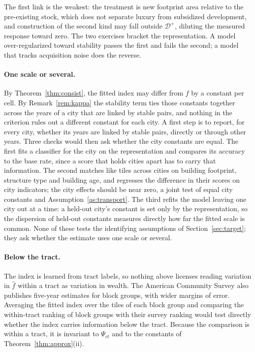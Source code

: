 \documentclass[11pt]{article}
\theoremstyle{remark}
\begin{document}
The first link is the weakest: the treatment is new footprint area relative to the pre-existing stock,
which does not separate luxury from subsidized development, and construction of the second kind may fall
outside $\mathcal{D}^{+}$, diluting the measured response toward zero. The two exercises bracket the
representation. A model over-regularized toward stability passes the first and fails the second; a model
that tracks acquisition noise does the reverse.

\paragraph{One scale or several.} By Theorem~\ref{thm:consist}, the fitted index may differ from $f$
by a constant per cell. By Remark~\ref{rem:kappa} the stability term ties those constants together
across the years of a city that are linked by stable pairs, and nothing in the criterion rules out a
different constant for each city. A first step is to report, for every city, whether its years are
linked by stable pairs, directly or through other years. Three checks would then ask whether the city
constants are equal. The first fits a classifier for the city on the representation and compares its accuracy to the base rate, since
a score that holds cities apart has to carry that information. The second matches like tiles across
cities on building footprint, structure type and building age, and regresses the difference in their
scores on city indicators; the city effects should be near zero, a joint test of equal city constants and
Assumption~\ref{as:transport}. The third refits the model leaving one city out at a time: a held-out
city's constant is set only by the representation, so the dispersion of held-out constants measures
directly how far the fitted scale is common. None of these tests the identifying assumptions of
Section~\ref{sec:target}; they ask whether the estimate uses one scale or several.

\paragraph{Below the tract.} The index is learned from tract labels, so nothing above licenses reading
variation in $\hat f$ within a tract as variation in wealth. The American Community Survey also
publishes five-year estimates for block groups, with wider margins of error. Averaging the fitted
index over the tiles of each block group and comparing the within-tract ranking of block groups with
their survey ranking would test directly whether the index carries information below the tract. Because the
comparison is within a tract, it is invariant to $\Psi_{ct}$ and to the constants of
Theorem~\ref{thm:approx}(ii).
\end{document}
